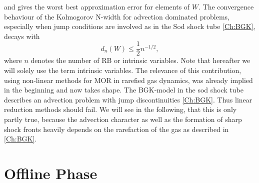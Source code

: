and gives the worst best approximation error for elements of \(W\). The convergence behaviour of the Kolmogorov N-width for advection dominated problems, especially when jump conditions are involved as in the Sod shock tube \cref{Ch:BGK}, decays with
\begin{equation}
	d_n(W) \leq \frac{1}{2} n^{-1/2},
\end{equation}
where \(n\) denotes the number of RB or intrinsic variables. Note that hereafter we will solely use the term intrinsic variables\cite{ohlberger2015reduced}. The relevance of this contribution, using non-linear methods for MOR in rarefied gas dynamics, was already implied in the beginning and now takes shape. The BGK-model in the sod shock tube describes an advection problem with jump discontinuities \cref{Ch:BGK}. Thus linear reduction methods should fail. We will see in the following, that this is only partly true, because the advection character as well as the formation of sharp shock fronts heavily depends on the rarefaction of the gas as described in \cref{Ch:BGK}.
\section{Offline Phase}

